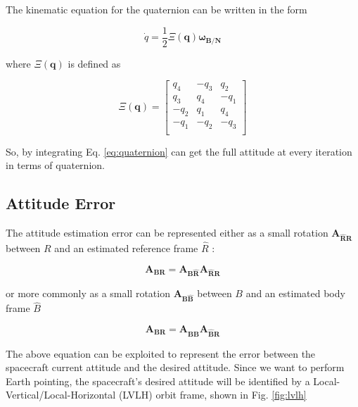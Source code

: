\documentclass[11pt,a4paper]{report}
\begin{document}
The kinematic equation for the quaternion can be written in the form

\begin{equation}
 \label{eq:quaternion}
 \dot{q} = \frac{1}{2} \mathbf{\varXi(\mathbf{q})} \mathbf{\omega_{B/N}}
\end{equation}

where $\mathbf{\varXi(\mathbf{q})}$ is defined as 

\begin{equation*}
 \mathbf{\varXi(\mathbf{q})} =
                                \begin{bmatrix}
                                   q_4 & -q_3 & q_2\\
                                   q_3 & q_4 & -q_1\\
                                  -q_2 & q_1 & q_4\\
                                  -q_1 & -q_2 & -q_3\\
                                \end{bmatrix}
\end{equation*}

So, by integrating Eq. \ref{eq:quaternion} can get the full attitude at every iteration in terms of quaternion.

\subsection{Attitude Error} \label{sec:lvlh}
The attitude estimation error can be represented either as a small rotation $\mathbf{A_{\hat{R}R}}$ between $R$ and an estimated reference frame $\hat{R}$ :

\begin{equation*}
 \mathbf{A_{BR}} = \mathbf{A_{B \hat{R}}} \mathbf{A_{\hat{R}R}}
\end{equation*}

or more commonly as a small rotation $\mathbf{A_{B \hat{B}}}$ between $B$ and an estimated body frame $\hat{B}$

\begin{equation*}
 \mathbf{A_{BR}} = \mathbf{A_{\hat{B}B}} \mathbf{A_{\hat{B}R}}
\end{equation*}

The above equation can be exploited to represent the error between the spacecraft current attitude and the desired attitude.
Since we want to perform Earth pointing, the spacecraft's desired attitude will be identified by a Local-Vertical/Local-Horizontal (LVLH) orbit frame, shown in Fig. \ref{fig:lvlh}
\end{document}
